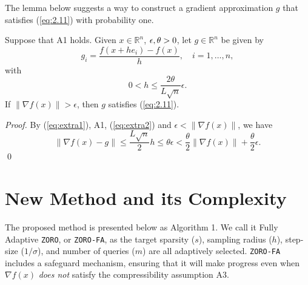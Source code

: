 The lemma below suggests a way to construct a gradient approximation $g$ that satisfies (\ref{eq:2.11}) with probability one. 

\begin{lemma}
Suppose that A1 holds. Given $x\in\mathbb{R}^{n}$, $\epsilon,\textcolor{black}{\theta}>0$, let $g\in\mathbb{R}^{n}$ be given by
\begin{equation}
g_{i}=\dfrac{f(x+h e_{i})-f(x)}{h},\quad i=1,\ldots,n,
\label{eq:extra1}
\end{equation}
with 
\begin{equation}
0<h\leq\dfrac{2\theta}{L\sqrt{n}}\epsilon.
\label{eq:extra2}
\end{equation}
If $\|\nabla f(x)\|>\epsilon$, then $g$ satisfies (\ref{eq:2.11}).
\label{lem:2.4}
\end{lemma}

\begin{proof}
By (\ref{eq:extra1}), A1, (\ref{eq:extra2}) and $\epsilon<\|\nabla f(x)\|$, we have
\begin{equation*}
\|\nabla f(x)-g\|\leq\dfrac{L\sqrt{n}}{2}h\leq\theta\epsilon<\frac{\theta}{2}\|\nabla f(x)\|+\frac{\theta}{2}\epsilon.
\end{equation*}
\qed
\end{proof}


\section{New Method and its Complexity}

The proposed method is presented below as Algorithm 1. We call it Fully Adaptive {\tt ZORO}, or {\tt ZORO-FA}, as the target sparsity ($s$), sampling radius ($h$), step-size ($1/\sigma$), and number of queries ($m$) are all adaptively selected. {\tt ZORO-FA} includes a safeguard mechanism, ensuring that it will make progress even when $\nabla f(x)$ {\em does not} satisfy the compressibility assumption A3. 

